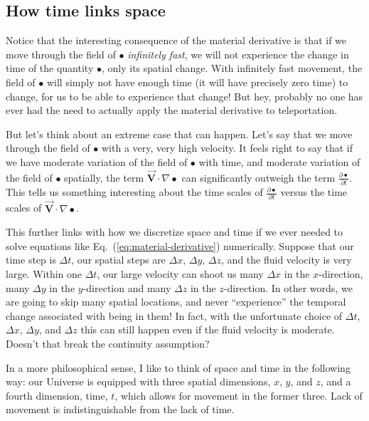 \subsection{How time links space}

Notice that the interesting consequence of the material derivative is that if we move through the field of $\bullet$ \textit{infinitely fast}, we will not experience the change in time of the quantity $\bullet$, only its spatial change. With infinitely fast movement, the field of $\bullet$ will simply not have enough time (it will have precisely zero time) to change, for us to be able to experience that change! But hey, probably no one has ever had the need to actually apply the material derivative to teleportation.

But let's think about an extreme case that can happen. Let's say that we move through the field of $\bullet$ with a very, very high velocity. It feels right to say that if we have moderate variation of the field of $\bullet$ with time, and moderate variation of the field of $\bullet$ spatially, the term $\vec{\bm{V}} \cdot \nabla \bullet$ can significantly outweigh the term $\frac{\partial \bullet}{\partial t}$.
This tells us something interesting about the time scales of $\frac{\partial \bullet}{\partial t}$ versus the time scales of $\vec{\bm{V}} \cdot \nabla \bullet$. 


This further links with how we discretize space and time if we ever needed to solve equations like Eq.~(\ref{eq:material-derivative}) numerically. Suppose that our time step is $\Delta t$, our spatial steps are $\Delta x$, $\Delta y$, $\Delta z$, and the fluid velocity is very large. Within one $\Delta t$, our large velocity can shoot us many $\Delta x$ in the $x$-direction, many $\Delta y$ in the $y$-direction and many $\Delta z$ in the $z$-direction. In other words, we are going to skip many spatial locations, and never ``experience'' the temporal change associated with being in them! In fact, with the unfortunate choice of $\Delta t$, $\Delta x$, $\Delta y$, and $\Delta z$ this can still happen even if the fluid velocity is moderate. Doesn't that break the continuity assumption?

In a more philosophical sense, I like to think of space and time in the following way: our Universe is equipped with three spatial dimensions, $x$, $y$, and $z$, and a fourth dimension, time, $t$, which allows for movement in the former three. Lack of movement is indistinguishable from the lack of time.